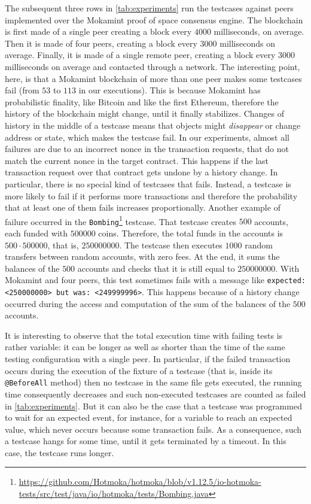 The subsequent three rows in \cref{tab:experiments} run the testcases
against peers implemented over the Mokamint proof of space consensus engine.
The blockchain is first made of a single peer creating a block every $4000$
milliseconds, on average. Then it is made of four peers,
creating a block every $3000$ milliseconds on average. Finally, it is made of a single remote peer,
creating a block every $3000$ milliseconds on average and contacted through a network. The
interesting point, here, is that a Mokamint blockchain of more than one peer makes
some testcases fail (from $53$ to $113$ in our executions). This is because Mokamint has probabilistic
finality, like Bitcoin and like the first Ethereum, therefore the history of the
blockchain might change, until it finally stabilizes. Changes of history in the middle
of a testcase means that objects might \emph{disappear} or change address or state, which makes
the testcase fail. In our experiments,
almost all failures are due to an incorrect nonce in the transaction requests,
that do not match the current nonce in the target contract. This happens if the last transaction
request over that contract gets undone by a history change.
In particular, there is no special kind of testcases that fails. Instead, a testcase
is more likely to fail if it performs more transactions and therefore the probability
that at least one of them fails increases proportionally.
Another example of failure occurred in the \texttt{Bombing}\footnote{\url{https://github.com/Hotmoka/hotmoka/blob/v1.12.5/io-hotmoka-tests/src/test/java/io/hotmoka/tests/Bombing.java}} testcase.
That testcase creates $500$ accounts, each funded with $500000$ coins. Therefore, the total funds in the
accounts is $500\cdot 500000$, that is, $250000000$. The testcase then executes
$1000$ random transfers between random accounts, with zero fees. At the end, it sums
the balances of the $500$ accounts and checks that it is still equal to $250000000$.
With Mokamint and four peers, this test sometimes fails with a message like
\texttt{expected: <250000000> but was: <249999996>}. This happens because of a history change
occurred during the access and computation of the sum of the balances of the $500$ accounts.

It is interesting to observe that the total execution time with failing tests
is rather variable: it can be longer as well as shorter than the time of the same testing configuration
with a single peer. In particular, if the failed transaction occurs during the
execution of the fixture of a testcase (that is, inside its \texttt{@BeforeAll} method) then
no testcase in the same file gets executed, the running time consequently
decreases and such non-executed testcases
are counted as failed in \cref{tab:experiments}. But it can also be the case that a testcase
was programmed to wait for an expected event, for instance, for a variable to reach an expected value,
which never occurs because some transaction fails.
As a consequence, such a testcase hangs for some time, until it gets terminated by a timeout.
In this case, the testcase runs longer.

